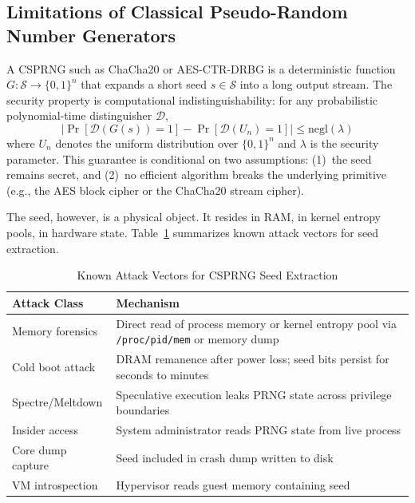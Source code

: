 \documentclass[journal]{IEEEtran}
\begin{document}
\subsection{Limitations of Classical Pseudo-Random Number Generators}
\label{subsec:prng}

A CSPRNG such as ChaCha20 or AES-CTR-DRBG is a deterministic function $G\colon \mathcal{S} \to \{0,1\}^n$ that expands a short seed $s \in \mathcal{S}$ into a long output stream. The security property is computational indistinguishability: for any probabilistic polynomial-time distinguisher $\mathcal{D}$,
\begin{equation}
\bigl|\Pr[\mathcal{D}(G(s)) = 1] - \Pr[\mathcal{D}(U_n) = 1]\bigr| \leq \mathrm{negl}(\lambda)
\label{eq:csprng_security}
\end{equation}
where $U_n$ denotes the uniform distribution over $\{0,1\}^n$ and $\lambda$ is the security parameter. This guarantee is conditional on two assumptions: (1)~the seed remains secret, and (2)~no efficient algorithm breaks the underlying primitive (e.g., the AES block cipher or the ChaCha20 stream cipher).

The seed, however, is a physical object. It resides in RAM, in kernel entropy pools, in hardware state. Table~\ref{tab:prng_attacks} summarizes known attack vectors for seed extraction.

\begin{table}[t]
\caption{Known Attack Vectors for CSPRNG Seed Extraction}
\label{tab:prng_attacks}
\begin{center}
\begin{tabular}{@{}lp{4.8cm}@{}}
\toprule
\textbf{Attack Class} & \textbf{Mechanism} \\
\midrule
Memory forensics & Direct read of process memory or kernel entropy pool via \texttt{/proc/pid/mem} or memory dump \\
Cold boot attack & DRAM remanence after power loss; seed bits persist for seconds to minutes \\
Spectre/Meltdown & Speculative execution leaks PRNG state across privilege boundaries \\
Insider access & System administrator reads PRNG state from live process \\
Core dump capture & Seed included in crash dump written to disk \\
VM introspection & Hypervisor reads guest memory containing seed \\
\bottomrule
\end{tabular}
\end{center}
\end{table}
\end{document}
